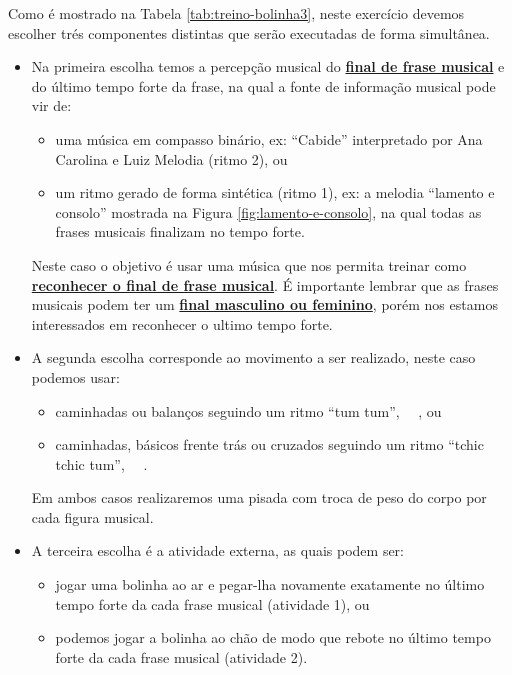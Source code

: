 \begin{example}
Como é mostrado na Tabela \ref{tab:treino-bolinha3},
neste exercício devemos escolher trés componentes distintas que serão executadas de forma simultânea.
\begin{itemize}
\item Na primeira escolha temos a percepção musical do 
\hyperref[pos:detetandoiniciofrase]{\textbf{final de frase musical}} 
e do último tempo forte da frase, na qual a fonte de informação musical pode vir de:
    \begin{itemize}
    \item uma música em compasso binário, ex: ``Cabide'' interpretado por Ana Carolina e Luiz Melodia (ritmo 2), ou
    \item um ritmo gerado de forma sintética (ritmo 1),
    ex: a melodia ``lamento e consolo'' mostrada na Figura \ref{fig:lamento-e-consolo}, 
    na qual todas as frases musicais finalizam no tempo forte.
    \end{itemize}
Neste caso o objetivo é usar uma música que nos permita treinar
como \hyperref[pos:detetandoiniciofrase]{\textbf{reconhecer o final de frase musical}}. 
É importante lembrar que as frases musicais podem ter um 
\hyperref[subsec:finaldefrasemus1]{\textbf{final masculino ou feminino}}, 
porém nos estamos interessados em reconhecer o ultimo tempo forte.
\item A segunda escolha corresponde ao movimento a ser realizado,
neste caso podemos usar:
    \begin{itemize}
    \item caminhadas ou balanços seguindo um ritmo ``tum tum'', 
    \leftrepeat~\Vier\Vier~\rightrepeat, ou 
    \item caminhadas, básicos frente trás ou cruzados seguindo um ritmo ``tchic tchic tum'', 
    \leftrepeat~\Vier\Acht\Acht~\rightrepeat.
    \end{itemize}
Em ambos casos realizaremos uma pisada com troca de peso do corpo por cada figura musical.
\item A terceira escolha é a atividade externa, as quais podem ser: 
    \begin{itemize}
    \item jogar uma bolinha ao ar e pegar-lha novamente exatamente no último tempo forte da cada frase musical (atividade 1), ou
    \item podemos jogar a bolinha ao chão de modo que rebote no último tempo forte da cada frase musical (atividade 2).
    \end{itemize}
\end{itemize}
\end{example}

